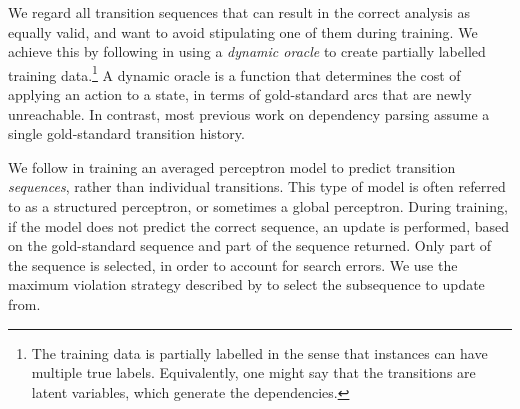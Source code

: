 \documentclass[11pt,letterpaper]{article}
\begin{document}
We regard all transition sequences that can result in the correct analysis as
equally valid, and want to avoid stipulating one of them during training.  
We achieve this by following \citet{goldberg:12} in using a
\emph{dynamic oracle} to create partially labelled training data.\footnote{
The training data is partially labelled in the sense that instances can have multiple
true labels. Equivalently, one might say that the transitions are latent variables,
which generate the dependencies.}
A dynamic oracle is a function that determines the cost of applying an
action to a state, in terms of gold-standard arcs that are newly unreachable.
In contrast, most previous work on dependency parsing assume a single gold-standard
transition history.

We follow \citet{collins:02} in training an averaged perceptron model to predict
transition \emph{sequences}, rather than individual transitions.  This type of model
is often referred to as a structured perceptron, or sometimes a global perceptron.
During training, if the model does not predict the correct sequence, an update
is performed, based on the gold-standard sequence and part of the sequence returned.
Only part of the sequence is selected, in order to account for search errors.
We use the maximum violation strategy described by \citet{huang:12} to select
the subsequence to update from.
\end{document}
